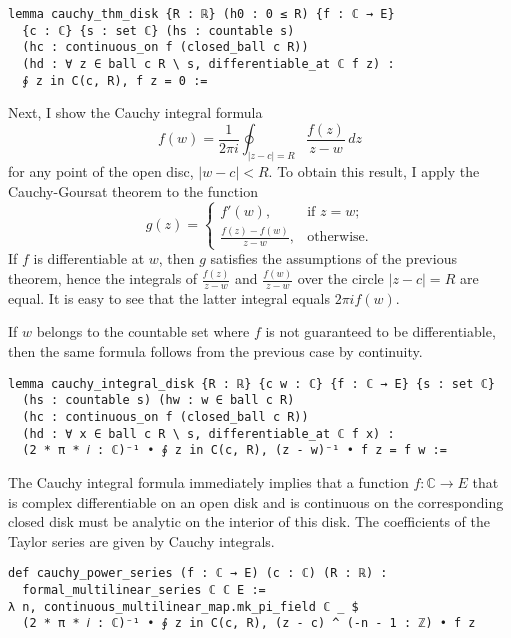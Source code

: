 \documentclass[a4paper, UKenglish,cleveref, autoref, thm-restate]{lipics-v2021}
\newcommand{\bbC}{\mathbb{C}}
\begin{document}
\begin{lstlisting}[caption=The Cauchy-Goursat theorem for a disk,label=lst:cauchy-circle]
lemma cauchy_thm_disk {R : ℝ} (h0 : 0 ≤ R) {f : ℂ → E}
  {c : ℂ} {s : set ℂ} (hs : countable s)
  (hc : continuous_on f (closed_ball c R))
  (hd : ∀ z ∈ ball c R \ s, differentiable_at ℂ f z) :
  ∮ z in C(c, R), f z = 0 :=
\end{lstlisting}

Next, I show the Cauchy integral formula
\[
  f(w)=\frac{1}{2\pi i}\oint_{|z-c|=R}\frac{f(z)}{z-w}\,dz
\]
for any point of the open disc, \(|w-c|<R\). To obtain this result, I
apply the Cauchy-Goursat theorem to the function
\[
  g(z)=
  \begin{cases}
    f'(w),&\text{if }z=w;\\
    \frac{f(z)-f(w)}{z-w},&\text{otherwise}.
  \end{cases}
\]
If \(f\) is differentiable at \(w\), then \(g\) satisfies the
assumptions of the previous theorem, hence the integrals of
\(\frac{f(z)}{z-w}\) and \(\frac{f(w)}{z-w}\) over the circle
\(|z-c|=R\) are equal. It is easy to see that the latter integral
equals \(2\pi i f(w)\).

If \(w\) belongs to the countable set where \(f\) is not guaranteed to
be differentiable, then the same formula follows from the previous case by
continuity.

\begin{lstlisting}[caption=Cauchy integral formula for a circle,label=lst:cauchy-int]
lemma cauchy_integral_disk {R : ℝ} {c w : ℂ} {f : ℂ → E} {s : set ℂ}
  (hs : countable s) (hw : w ∈ ball c R)
  (hc : continuous_on f (closed_ball c R))
  (hd : ∀ x ∈ ball c R \ s, differentiable_at ℂ f x) :
  (2 * π * 𝑖 : ℂ)⁻¹ • ∮ z in C(c, R), (z - w)⁻¹ • f z = f w :=
\end{lstlisting}

The Cauchy integral formula immediately implies that a function
\(f\colon\bbC\to E\) that is complex differentiable on an open disk
and is continuous on the corresponding closed disk must be analytic on
the interior of this disk. The coefficients of the Taylor series are
given by Cauchy integrals.

\begin{lstlisting}[caption=Power series for a function differentiable on a disk,label=lst:cauchy-series]
def cauchy_power_series (f : ℂ → E) (c : ℂ) (R : ℝ) :
  formal_multilinear_series ℂ ℂ E :=
λ n, continuous_multilinear_map.mk_pi_field ℂ _ $
  (2 * π * 𝑖 : ℂ)⁻¹ • ∮ z in C(c, R), (z - c) ^ (-n - 1 : ℤ) • f z
\end{lstlisting}
\end{document}

